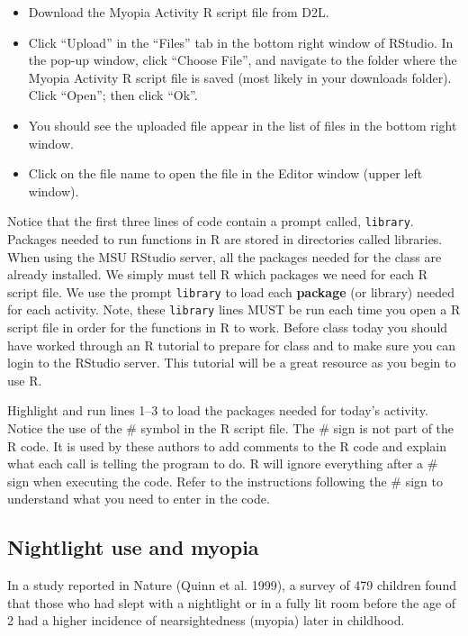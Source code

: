 \documentclass[
]{report}
\providecommand{\tightlist}{%
  \setlength{\itemsep}{0pt}\setlength{\parskip}{0pt}}
\begin{document}
\begin{itemize}
\tightlist
\item
  Download the Myopia Activity R script file from D2L.
\item
  Click ``Upload'' in the ``Files'' tab in the bottom right window of RStudio. In the pop-up window, click ``Choose File'', and navigate to the folder where the Myopia Activity R script file is saved (most likely in your downloads folder). Click ``Open''; then click ``Ok''.
\item
  You should see the uploaded file appear in the list of files in the bottom right window.
\item
  Click on the file name to open the file in the Editor window (upper left window).
\end{itemize}

Notice that the first three lines of code contain a prompt called, \texttt{library}. Packages needed to run functions in R are stored in directories called libraries. When using the MSU RStudio server, all the packages needed for the class are already installed. We simply must tell R which packages we need for each R script file. We use the prompt \texttt{library} to load each \textbf{package} (or library) needed for each activity. Note, these \texttt{library} lines MUST be run each time you open a R script file in order for the functions in R to work. Before class today you should have worked through an R tutorial to prepare for class and to make sure you can login to the RStudio server. This tutorial will be a great resource as you begin to use R.

Highlight and run lines 1--3 to load the packages needed for today's activity. Notice the use of the \# symbol in the R script file. The \# sign is not part of the R code. It is used by these authors to add comments to the R code and explain what each call is telling the program to do.
R will ignore everything after a \# sign when executing the code. Refer to the instructions following the \# sign to understand what you need to enter in the code.

\hypertarget{nightlight-use-and-myopia}{%
\subsection*{Nightlight use and myopia}\label{nightlight-use-and-myopia}}

In a study reported in Nature (Quinn et al. 1999), a survey of 479 children found that those who had slept with a nightlight or in a fully lit room before the age of 2 had a higher incidence of nearsightedness (myopia) later in childhood.
\end{document}
